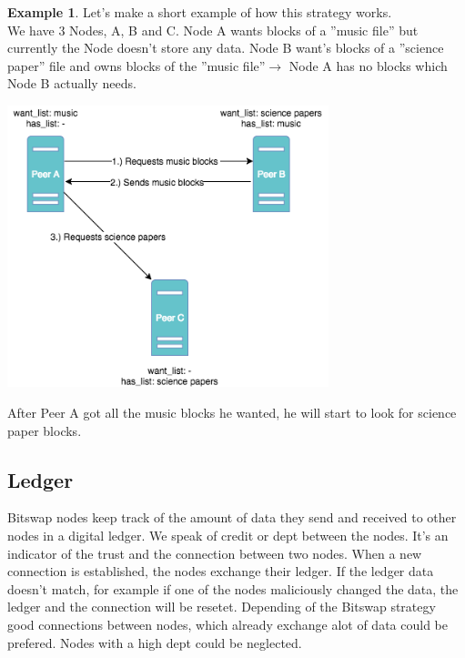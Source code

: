 \documentclass[a4paper,11pt, oneside]{report}
\theoremstyle{definition}
\newtheorem{exmp}{Example}[subsection]
\begin{document}
\newpage
\begin{exmp}
Let's make a short example of how this strategy works.\\ 
We have 3 Nodes, A, B and C. Node A wants blocks of a ''music file'' but currently the Node doesn't store any data. Node B want's blocks of a ''science paper'' file and owns blocks of the ''music file''$\rightarrow$ Node A has no blocks which Node B actually needs.
\begin{center}
\includegraphics[width=0.7\textwidth]{img/ipfs_bitswap_noblocks.png}\\[0.3cm] 
\end{center}
After Peer A got all the music blocks he wanted, he will start to look for science paper blocks.
\end{exmp}

\subsection{Ledger}
Bitswap nodes keep track of the amount of data they send and received to other nodes in a digital ledger. We speak of credit or dept between the nodes. It's an indicator of the trust and the connection between two nodes. When a new connection is established, the nodes exchange their ledger. If the ledger data doesn't match, for example if one of the nodes  maliciously changed the data, the ledger and the connection will be resetet. Depending of the Bitswap strategy good connections between nodes, which already exchange alot of data could be prefered. Nodes with a high dept could be neglected.

\newpage
\end{document}
